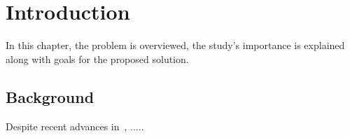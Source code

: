 \chapter{Introduction}\label{chap:intro}

In this chapter, the problem is overviewed, the study’s importance is explained along with goals for the proposed solution. 

\section{Background}
Despite recent advances in~\cite{cloud}, .....